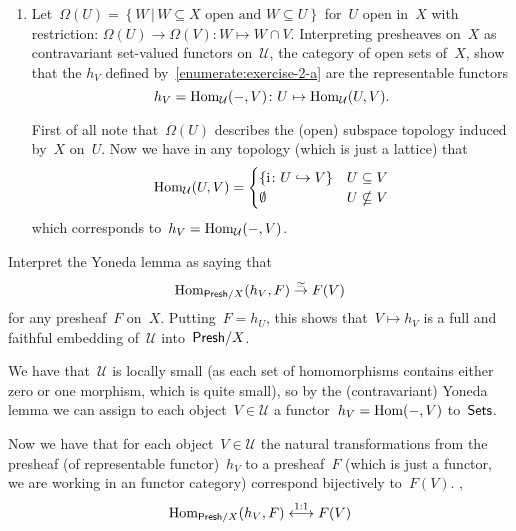 \documentclass[a4paper,11pt,oneside,openany,article]{memoir}
\begin{document}
\begin{enumerate}
\begin{enumerate}
      \item\label{enumerate:exercise-2-b} Let~$\Omega(U)=\left\{ W\,|\,\text{$W\subseteq X$ open and~$W\subseteq U$} \right\}$ for~$U$ open in~$X$ with restriction: $\Omega(U)\to\Omega(V):W\mapsto W\cap V$. Interpreting presheaves on~$X$ as contravariant set-valued functors on~$\mathcal{U}$, the category of open sets of~$X$, show that the $h_V$ defined by~\ref{enumerate:exercise-2-a} are the representable functors
        \begin{equation}
          h_V=\operatorname{Hom}_{\mathcal{U}}(-, V)\colon U\mapsto\operatorname{Hom}_{\mathcal{U}}(U,V).
        \end{equation}

        \begin{solution}
          First of all note that~$\Omega(U)$ describes the (open) subspace topology induced by~$X$ on~$U$. Now we have in any topology (which is just a lattice) that
          \begin{equation}
            \operatorname{Hom}_{\mathcal{U}}(U,V)=
            \begin{cases}
              \left\{ \mathrm{i}\colon U\hookrightarrow V \right\} & U\subseteq V \\
              \emptyset & U\nsubseteq V
            \end{cases}
          \end{equation}
          which corresponds to~$h_V=\operatorname{Hom}_{\mathcal{U}}(-,V)$.
        \end{solution}
    \end{enumerate}

    Interpret the Yoneda lemma as saying that
    \begin{equation}
      \operatorname{Hom}_{\mathsf{Presh}/X}(h_V,F)\overset{\simeq}{\to}F(V)
    \end{equation}
    for any presheaf~$F$ on~$X$. Putting~$F=h_U$, this shows that~$V\mapsto h_V$ is a full and faithful embedding of~$\mathcal{U}$ into~$\mathsf{Presh}/X$.

    \begin{solution}
      We have that~$\mathcal{U}$ is locally small (as each set of homomorphisms contains either zero or one morphism, which is quite small), so by the (contravariant) Yoneda lemma we can assign to each object~$V\in\mathcal{U}$ a functor~$h_V=\operatorname{Hom}(-,V)$ to~$\mathsf{Sets}$.
      
      Now we have that for each object~$V\in\mathcal{U}$ the natural transformations from the presheaf (of representable functor)~$h_V$ to a presheaf~$F$ (which is just a functor, we are working in an functor category) correspond bijectively to~$F(V)$. \Ie,
      \begin{equation}
        \operatorname{Hom}_{\mathsf{Presh}/X}(h_V,F)\overset{1:1}{\longleftrightarrow}F(V)
      \end{equation}
    \end{solution}


\end{enumerate}
\end{document}

